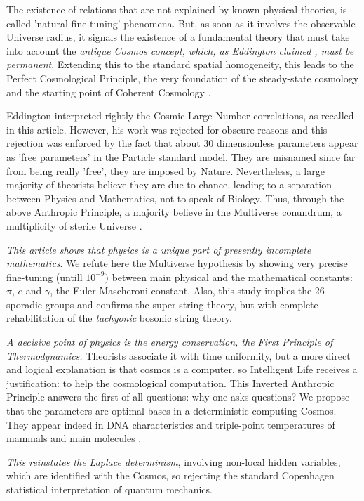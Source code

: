 \documentclass[twoside,draft]{article}
\begin{document}
\begin{sloppypar}
The existence of relations that are not explained by known physical theories, is called 'natural fine tuning' phenomena. But, as soon as it involves the observable Universe radius, it signals the existence of a fundamental theory that must take into account the \textit{antique Cosmos concept, which, as Eddington claimed \cite{Eddington}, must be permanent}. Extending this to the standard spatial homogeneity, this leads to the Perfect Cosmological Principle, the very foundation of the steady-state cosmology and the starting point of Coherent Cosmology \cite{Sanchez1}.

Eddington interpreted rightly the Cosmic Large Number correlations, as recalled in this article. However, his work was rejected for obscure reasons and this rejection was enforced by the fact that about 30 dimensionless parameters appear as 'free parameters' in the Particle standard model. They are misnamed since far from being really 'free', they are imposed by Nature. Nevertheless, a large majority of theorists believe they are due to chance, leading to a separation between Physics and Mathematics, not to speak of Biology. Thus, through the above Anthropic Principle, a majority believe in the Multiverse conundrum, a multiplicity of sterile Universe \cite{Carr}.

\textit{This article shows that physics is a unique part of presently incomplete mathematics}. We refute here the Multiverse hypothesis by showing very precise fine-tuning (untill $10^{-9})$ between main physical and the mathematical constants: $\pi$, $e$ and $\gamma$, the Euler-Mascheroni constant. Also, this study implies the 26 sporadic groups and confirms the super-string theory, but with complete rehabilitation of the \textit{tachyonic} bosonic string theory.

\textit{A decisive point of physics is the energy conservation, the First Principle of Thermodynamics.} Theorists associate it with time uniformity, but a more direct and logical explanation is that cosmos is a computer, so Intelligent Life receives a justification: to help the cosmological computation. This Inverted Anthropic Principle answers the first of all questions: why one asks questions? We propose that the parameters are optimal bases in a deterministic computing Cosmos. They appear indeed in DNA characteristics and triple-point temperatures of mammals and main molecules \cite{Sanchez1}.

\textit{This reinstates the Laplace determinism}, involving non-local hidden variables, which are identified with the Cosmos, so rejecting the standard Copenhagen statistical interpretation of quantum mechanics.


\end{sloppypar}
\end{document}
